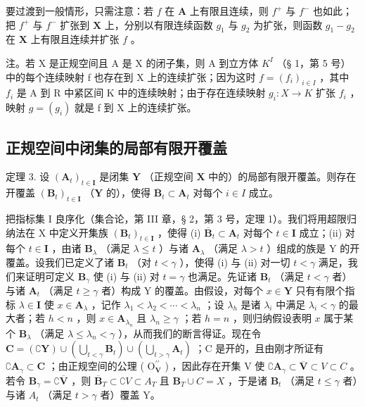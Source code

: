要过渡到一般情形，只需注意：若 \(f\) 在 \(\mathbf{A}\) 上有限且连续，则 \(f^{+}\) 与 \(f^{-}\) 也如此；把 \(f^{+}\) 与 \(f^{-}\) 扩张到 \(\mathbf{X}\) 上，分别以有限连续函数 \(g_{1}\) 与 \(g_{2}\) 为扩张，则函数 \(g_{1} - g_{2}\) 在 \(\mathbf{X}\) 上有限且连续并扩张 \(f\) 。

注。若 X 是正规空间且 A 是 X 的闭子集，则 A 到立方体 \(K^{I}\) （§ 1，第 5 号）中的每个连续映射 f 也存在到 X 上的连续扩张；因为这时 \(f = (f_{i})_{i \in I}\) ，其中 \(f_{i}\) 是 A 到 R 中紧区间 K 中的连续映射；由于存在连续映射 \(g_{i}: X \to K\) 扩张 \(f_{i}\) ，映射 \(g = (g_{i})\) 就是 f 到 X 上的连续扩张。

\subsection{正规空间中闭集的局部有限开覆盖}

定理 3. 设 \((\mathbf{A}_t)_{t\in \mathbf{I}}\) 是闭集 \(\mathbf{Y}\) （正规空间 \(\mathbf{X}\) 中的）的局部有限开覆盖。则存在开覆盖 \((\mathbf{B}_t)_{t\in \mathbf{I}}\) （\(\mathbf{Y}\) 的），使得 \(\overline{\mathbf{B}}_t\subset \mathbf{A}_t\) 对每个 \(i\in I\) 成立。

把指标集 I 良序化（集合论，第 III 章，§ 2，第 3 号，定理 1）。我们将用超限归纳法在 X 中定义开集族 \((\mathbf{B}_t)_{t \in \mathbf{I}}\) ，使得 (i) \(\overline{\mathbf{B}}_t \subset \mathbf{A}_t\) 对每个 \(t \in \mathbf{I}\) 成立；(ii) 对每个 \(t \in \mathbf{I}\) ，由诸 \(\mathbf{B}_\lambda\) （满足 \(\lambda \leqslant t\) ）与诸 \(\mathbf{A}_\lambda\) （满足 \(\lambda > t\) ）组成的族是 Y 的开覆盖。设我们已定义了诸 \(\mathbf{B}_t\) （对 \(t < \gamma\) ），使得 (i) 与 (ii) 对一切 \(t < \gamma\) 满足，我们来证明可定义 \(\mathbf{B}_\gamma\) 使 (i) 与 (ii) 对 \(t = \gamma\) 也满足。先证诸 \(\mathbf{B}_t\) （满足 \(t < \gamma\) 者）与诸 \(\mathbf{A}_t\) （满足 \(t \geqslant \gamma\) 者）构成 Y 的覆盖。由假设，对每个 \(x \in \mathbf{Y}\) 只有有限个指标 \(\lambda \in \mathbf{I}\) 使 \(x \in \mathbf{A}_\lambda\) ，记作 \(\lambda_1 < \lambda_2 < \cdots < \lambda_n\) ；设 \(\lambda_h\) 是诸 \(\lambda_i\) 中满足 \(\lambda_i < \gamma\) 的最大者；若 \(h < n\) ，则 \(x \in \mathbf{A}_{\lambda_n}\) 且 \(\lambda_n \geqslant \gamma\) ；若 \(h = n\) ，则归纳假设表明 \(x\) 属于某个 \(\mathbf{B}_\lambda\) （满足 \(\lambda \leqslant \lambda_n < \gamma\) ），从而我们的断言得证。现在令 \(\mathbf{C} = (\complement\mathbf{Y}) \cup (\bigcup_{t < \gamma} \mathbf{B}_t) \cup (\bigcup_{t > \gamma} \mathbf{A}_t)\) ；C 是开的，且由刚才所证有 \(\complement\mathbf{A}_\gamma \subset \mathbf{C}\) ；由正规空间的公理 ( \(\mathrm{O}_{\mathbf{V}}^{\prime\prime}\) ) ，因此存在开集 V 使 \(\complement\mathbf{A}_\gamma \subset \overline{\mathbf{V}} \subset V \subset C\) 。若令 \(\mathbf{B}_\gamma = \complement\overline{\mathbf{V}}\) ，则 \(\overline{\mathbf{B}}_T \subset \complement V \subset A_T\) 且 \(\mathbf{B}_T \cup C = X\) ，于是诸 \(\mathbf{B}_t\) （满足 \(t \leqslant \gamma\) 者）与诸 \(A_t\) （满足 \(t > \gamma\) 者）覆盖 Y。

